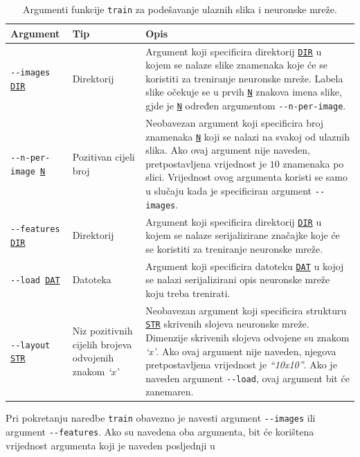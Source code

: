 \begin{table}[htb]
    \caption{Argumenti funkcije \texttt{train} za podešavanje ulaznih slika i neuronske mreže.}
    \label{tab:train-args-1}
    \scriptsize
    \centering
    \begin{tabular}{|M{3.5cm}|M{2.5cm}|M{6cm}|}
        \hline
        Argument & Tip & Opis \\
        \hline
        \texttt{-{}-images \underline{DIR}} & Direktorij & Argument koji specificira direktorij \texttt{\underline{DIR}}
        u kojem se nalaze slike znamenaka koje će se koristiti za treniranje neuronske mreže. Labela slike očekuje se u
        prvih \texttt{\underline{N}} znakova imena slike, gjde je \texttt{\underline{N}} određen argumentom
        \texttt{-{}-n-per-image}. \\
        \hline
        \texttt{-{}-n-per-image \underline{N}} & Pozitivan cijeli broj & Neobavezan argument koji specificira broj
        znamenaka \texttt{\underline{N}} koji se nalazi na svakoj od ulaznih slika. Ako ovaj argument nije naveden,
        pretpostavljena vrijednost je $10$ znamenaka po slici. Vrijednost ovog argumenta koristi se samo u slučaju kada
        je specificiran argument \texttt{-{}-images}. \\
        \hline
        \texttt{-{}-features \underline{DIR}} & Direktorij & Argument koji specificira direktorij
        \texttt{\underline{DIR}} u kojem se nalaze serijalizirane značajke koje će se koristiti za treniranje neuronske
        mreže. \\
        \hline
        \texttt{-{}-load \underline{DAT}} & Datoteka & Argument koji specificira datoteku \texttt{\underline{DAT}} u
        kojoj se nalazi serijalizirani opis neuronske mreže koju treba trenirati. \\
        \hline
        \texttt{-{}-layout \underline{STR}} & Niz pozitivnih cijelih brojeva odvojenih znakom \emph{`x'} &
        Neobavezan argument koji specificira strukturu \texttt{\underline{STR}} skrivenih slojeva neuronske mreže.
        Dimenzije skrivenih slojeva odvojene su znakom \emph{`x'}. Ako ovaj argument nije naveden, njegova
        pretpostavljena vrijednost je \emph{``10x10''}. Ako je naveden argument \texttt{-{}-load}, ovaj argument bit će
        zanemaren. \\
        \hline
    \end{tabular}
\end{table}
Pri pokretanju naredbe \texttt{train} obavezno je navesti argument \texttt{-{}-images} ili argument
\texttt{-{}-features}. Ako su navedena oba argumenta, bit će korištena vrijednost argumenta koji je naveden posljednji u
